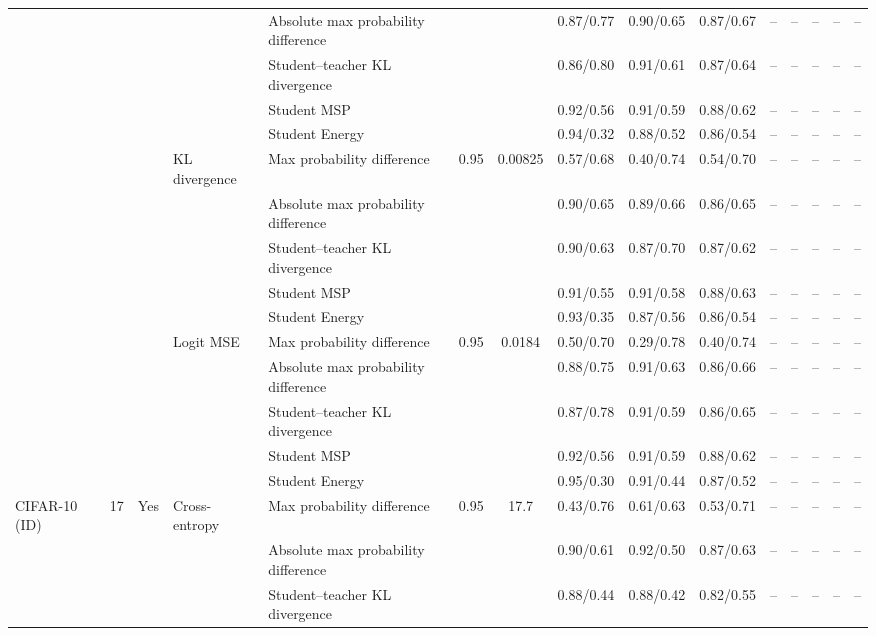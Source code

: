 \documentclass[border=2pt]{standalone}
\begin{document}
\begin{tabular}{lllllcccccccccc}
 &  &  &  & Absolute max probability difference &  &  & 0.87/0.77 & 0.90/0.65 & 0.87/0.67 & -- & -- & -- & -- & -- \\
 &  &  &  & Student--teacher KL divergence &  &  & 0.86/0.80 & 0.91/0.61 & 0.87/0.64 & -- & -- & -- & -- & -- \\
 &  &  &  & Student MSP &  &  & 0.92/0.56 & 0.91/0.59 & 0.88/0.62 & -- & -- & -- & -- & -- \\
 &  &  &  & Student Energy &  &  & 0.94/0.32 & 0.88/0.52 & 0.86/0.54 & -- & -- & -- & -- & -- \\
 &  &  & KL divergence & Max probability difference & 0.95 & 0.00825 & 0.57/0.68 & 0.40/0.74 & 0.54/0.70 & -- & -- & -- & -- & -- \\
 &  &  &  & Absolute max probability difference &  &  & 0.90/0.65 & 0.89/0.66 & 0.86/0.65 & -- & -- & -- & -- & -- \\
 &  &  &  & Student--teacher KL divergence &  &  & 0.90/0.63 & 0.87/0.70 & 0.87/0.62 & -- & -- & -- & -- & -- \\
 &  &  &  & Student MSP &  &  & 0.91/0.55 & 0.91/0.58 & 0.88/0.63 & -- & -- & -- & -- & -- \\
 &  &  &  & Student Energy &  &  & 0.93/0.35 & 0.87/0.56 & 0.86/0.54 & -- & -- & -- & -- & -- \\
 &  &  & Logit MSE & Max probability difference & 0.95 & 0.0184 & 0.50/0.70 & 0.29/0.78 & 0.40/0.74 & -- & -- & -- & -- & -- \\
 &  &  &  & Absolute max probability difference &  &  & 0.88/0.75 & 0.91/0.63 & 0.86/0.66 & -- & -- & -- & -- & -- \\
 &  &  &  & Student--teacher KL divergence &  &  & 0.87/0.78 & 0.91/0.59 & 0.86/0.65 & -- & -- & -- & -- & -- \\
 &  &  &  & Student MSP &  &  & 0.92/0.56 & 0.91/0.59 & 0.88/0.62 & -- & -- & -- & -- & -- \\
 &  &  &  & Student Energy &  &  & 0.95/0.30 & 0.91/0.44 & 0.87/0.52 & -- & -- & -- & -- & -- \\
\addlinespace
CIFAR-10 (ID) & 17 & Yes & Cross-entropy & Max probability difference & 0.95 & 17.7 & 0.43/0.76 & 0.61/0.63 & 0.53/0.71 & -- & -- & -- & -- & -- \\
 &  &  &  & Absolute max probability difference &  &  & 0.90/0.61 & 0.92/0.50 & 0.87/0.63 & -- & -- & -- & -- & -- \\
 &  &  &  & Student--teacher KL divergence &  &  & 0.88/0.44 & 0.88/0.42 & 0.82/0.55 & -- & -- & -- & -- & -- \\

\end{tabular}
\end{document}
